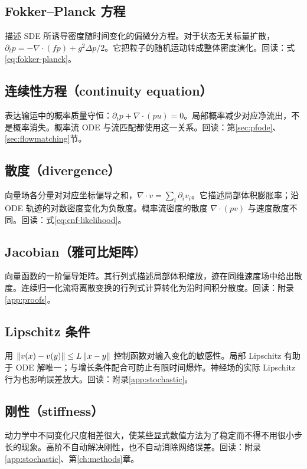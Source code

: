 \subsection*{Fokker--Planck 方程}\label{gl:fp}
描述 SDE 所诱导密度随时间变化的偏微分方程。对于状态无关标量扩散，$\partial_tp=-\nabla\cdot(fp)+g^2\Delta p/2$。它把粒子的随机运动转成整体密度演化。回读：式\eqref{eq:fokker-planck}。

\subsection*{连续性方程（continuity equation）}\label{gl:continuity}
表达输运中的概率质量守恒：$\partial_tp+\nabla\cdot(pu)=0$。局部概率减少对应净流出，不是概率消失。概率流 ODE 与流匹配都使用这一关系。回读：第\ref{sec:pfode}、\ref{sec:flowmatching}节。

\subsection*{散度（divergence）}\label{gl:divergence}
向量场各分量对对应坐标偏导之和，$\nabla\cdot v=\sum_i\partial_iv_i$。它描述局部体积膨胀率；沿 ODE 轨迹的对数密度变化为负散度。概率流密度的散度 $\nabla\cdot(pv)$ 与速度散度不同。回读：式\eqref{eq:cnf-likelihood}。

\subsection*{Jacobian（雅可比矩阵）}\label{gl:jacobian}
向量函数的一阶偏导矩阵。其行列式描述局部体积缩放，迹在同维速度场中给出散度。连续归一化流将离散变换的行列式计算转化为沿时间积分散度。回读：附录\ref{app:proofs}。

\subsection*{Lipschitz 条件}\label{gl:lipschitz}
用 $\left\lVert v(x)-v(y)\right\rVert\le L\left\lVert x-y\right\rVert$ 控制函数对输入变化的敏感性。局部 Lipschitz 有助于 ODE 解唯一；与增长条件配合可防止有限时间爆炸。神经场的实际 Lipschitz 行为也影响误差放大。回读：附录\ref{app:stochastic}。

\subsection*{刚性（stiffness）}\label{gl:stiffness}
动力学中不同变化尺度相差很大，使某些显式数值方法为了稳定而不得不用很小步长的现象。高阶不自动解决刚性，也不自动消除网络误差。回读：附录\ref{app:stochastic}、第\ref{ch:methods}章。

